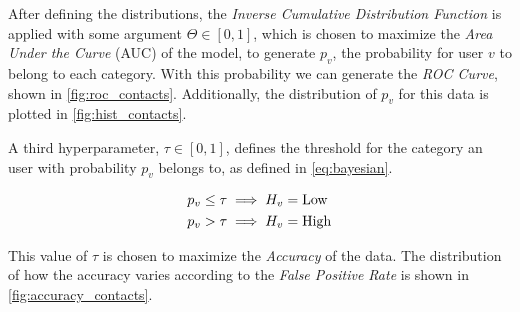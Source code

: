 After defining the distributions, the \emph{Inverse Cumulative Distribution Function} is applied with some argument $\Theta \in \left[ 0, 1 \right]$, which is chosen to maximize the \emph{Area Under the Curve} (AUC) of the model, to generate $p_v$, the probability for user $v$ to belong to each category. With this probability we can generate the \emph{ROC Curve}, shown in \cref{fig:roc_contacts}. Additionally, the distribution of $p_v$ for this data is plotted in \cref{fig:hist_contacts}.

A third hyperparameter, $\tau \in \left[ 0, 1 \right]$, defines the threshold for the category an user with probability $p_v$ belongs to, as defined in \cref{eq:bayesian}.

\begin{equation}
\label{eq:bayesian}
\begin{aligned}
	p_v \leq \tau &\implies H_v = \operatorname{Low} \\
	p_v > \tau &\implies H_v = \operatorname{High}
\end{aligned}
\end{equation}

This value of $\tau$ is chosen to maximize the \emph{Accuracy} of the data. The distribution of how the accuracy varies according to the \emph{False Positive Rate} is shown in \cref{fig:accuracy_contacts}.

